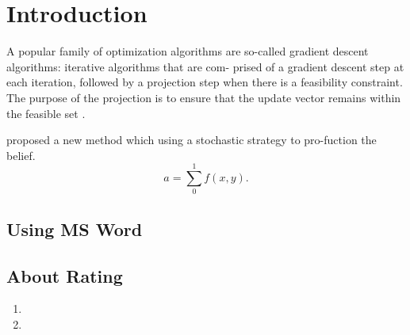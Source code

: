 \documentclass[a4paper,twoside,AutoFakeBold]{article}
\theoremstyle{definition}
\begin{document}

\maketitle
\thispagestyle{empty} \cleardoublepage

\rptcontent \thispagestyle{empty} \cleardoublepage

\begin{abstract}\kaiti \xiaosi
\lipsum[3]
\end{abstract}
\cleardoublepage

\songti\xiaosi
%
\section{Introduction}
\lipsum[6]

A popular family of optimization algorithms are so-called gradient descent algorithms: iterative algorithms that are com- prised of a gradient descent step at each iteration, followed by a projection step when there is a feasibility constraint. The purpose of the projection is to ensure that the update vector remains within the feasible set \cite{nesterov2013introductory}.

\citeauthor{wu2016decentralized} proposed a new method which using a stochastic strategy to pro-fuction the belief.
\[
a = \sum_0^1 f(x,y).
\]


\subsection{Using MS Word}
\lipsum[0]

\subsection{About Rating}
\lipsum[2]
\begin{enumerate}[(1)]
\item \lipsum[5]
\item \lipsum[7]
\end{enumerate}
\end{document}
